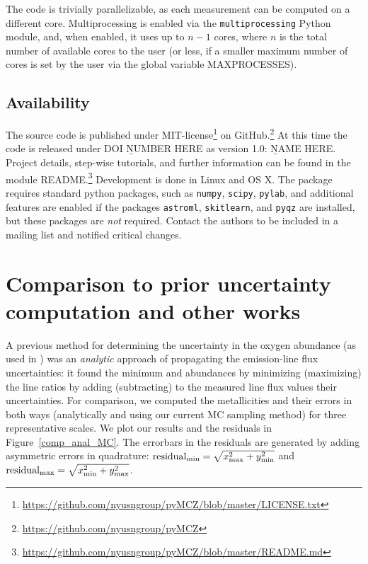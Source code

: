 \documentclass{emulateapj}
\begin{document}
The code is trivially parallelizable, as each measurement can be computed on a different core. Multiprocessing is enabled via the \verb=multiprocessing= Python module, and, when enabled, it uses up to $n-1$ cores, where $n$ is the total number of available cores to the user (or less, if a smaller maximum number of cores is set by the user via the global variable MAXPROCESSES).



\subsection{Availability}
The source code is published under MIT-license\footnote{\url{https://github.com/nyusngroup/pyMCZ/blob/master/LICENSE.txt}} on GitHub.\footnote{\url{https://github.com/nyusngroup/pyMCZ}} At this time the code is released under DOI {\b NUMBER HERE} as version 1.0: {\b NAME HERE}. Project
details, step-wise tutorials, and further information can be found in the module README.\footnote{\url{https://github.com/nyusngroup/pyMCZ/blob/master/README.md}}
Development is done in Linux and OS X. The package requires standard python packages, such as \verb=numpy=, \verb=scipy=, \verb=pylab=, and additional features are enabled if the packages \verb=astroml=, \verb=skitlearn=, and \verb=pyqz= are installed, but these packages are \emph{not} required. Contact the authors to be included in a mailing list and notified critical changes. 




\section{Comparison to prior uncertainty computation and other works }\label{comp_sec}


A previous method for determining the uncertainty in the oxygen abundance (as used in \citealt{modjaz08_Z,kewley10,rupke10,modjaz11}) was an \emph{analytic} approach of propagating the emission-line flux uncertainties: it found the minimum and abundances by minimizing (maximizing) the line ratios by adding (subtracting) to the measured line flux values their uncertainties. For comparison, we computed the metallicities and their errors in both ways (analytically and using our current MC sampling method) for three representative scales. We plot our results and the residuals in Figure~\ref{comp_anal_MC}. 
The errorbars in the residuals are generated by adding asymmetric errors in quadrature: $\mathrm{residual}_{\rm min}=\sqrt {x_{\rm max}^2 + y_{\rm min}^2}$ and $\mathrm{residual}_{\rm max}=\sqrt{x_{\rm min}^2 + y_{\rm max}^2}$. 
\end{document}
